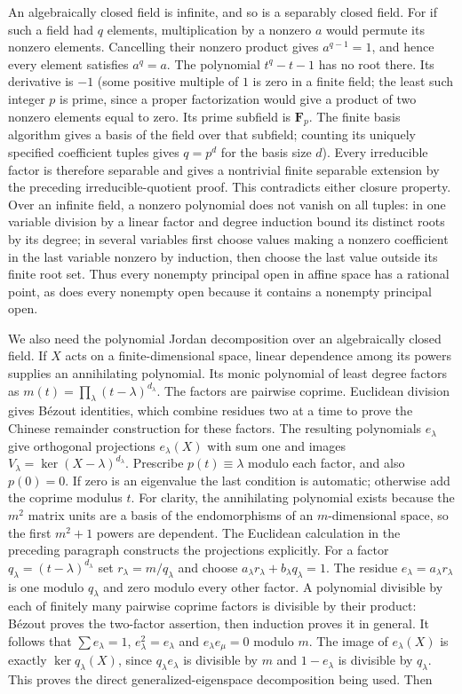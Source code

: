 \documentclass[11pt,a4paper,openany]{report}
\newcounter{none}
\begin{document}
An algebraically closed field is infinite, and so is a separably closed field. For if such a field had \(q\) elements, multiplication by a nonzero \(a\) would permute its nonzero elements. Cancelling their nonzero product gives \(a^{q-1}=1\), and hence every element satisfies \(a^q=a\). The polynomial \(t^q-t-1\) has no root there. Its derivative is \(-1\) (some positive multiple of \(1\) is zero in a finite field; the least such integer \(p\) is prime, since a proper factorization would give a product of two nonzero elements equal to zero. Its prime subfield is \(\mathbf F_p\). The finite basis algorithm gives a basis of the field over that subfield; counting its uniquely specified coefficient tuples gives \(q=p^d\) for the basis size \(d\)). Every irreducible factor is therefore separable and gives a nontrivial finite separable extension by the preceding irreducible-quotient proof. This contradicts either closure property. Over an infinite field, a nonzero polynomial does not vanish on all tuples: in one variable division by a linear factor and degree induction bound its distinct roots by its degree; in several variables first choose values making a nonzero coefficient in the last variable nonzero by induction, then choose the last value outside its finite root set. Thus every nonempty principal open in affine space has a rational point, as does every nonempty open because it contains a nonempty principal open.

We also need the polynomial Jordan decomposition over an algebraically closed field. If \(X\) acts on a finite-dimensional space, linear dependence among its powers supplies an annihilating polynomial. Its monic polynomial of least degree factors as \(m(t)=\prod_\lambda(t-\lambda)^{d_\lambda}\). The factors are pairwise coprime. Euclidean division gives Bézout identities, which combine residues two at a time to prove the Chinese remainder construction for these factors. The resulting polynomials \(e_\lambda\) give orthogonal projections \(e_\lambda(X)\) with sum one and images \(V_\lambda=\ker(X-\lambda)^{d_\lambda}\). Prescribe \(p(t)\equiv\lambda\) modulo each factor, and also \(p(0)=0\). If zero is an eigenvalue the last condition is automatic; otherwise add the coprime modulus \(t\). For clarity, the annihilating polynomial exists because the \(m^2\) matrix units are a basis of the endomorphisms of an \(m\)-dimensional space, so the first \(m^2+1\) powers are dependent. The Euclidean calculation in the preceding paragraph constructs the projections explicitly. For a factor \(q_\lambda=(t-\lambda)^{d_\lambda}\) set \(r_\lambda=m/q_\lambda\) and choose \(a_\lambda r_\lambda+b_\lambda q_\lambda=1\). The residue \(e_\lambda=a_\lambda r_\lambda\) is one modulo \(q_\lambda\) and zero modulo every other factor. A polynomial divisible by each of finitely many pairwise coprime factors is divisible by their product: Bézout proves the two-factor assertion, then induction proves it in general. It follows that \(\sum e_\lambda=1\), \(e_\lambda^2=e_\lambda\) and \(e_\lambda e_\mu=0\) modulo \(m\). The image of \(e_\lambda(X)\) is exactly \(\ker q_\lambda(X)\), since \(q_\lambda e_\lambda\) is divisible by \(m\) and \(1-e_\lambda\) is divisible by \(q_\lambda\). This proves the direct generalized-eigenspace decomposition being used. Then
\end{document}

